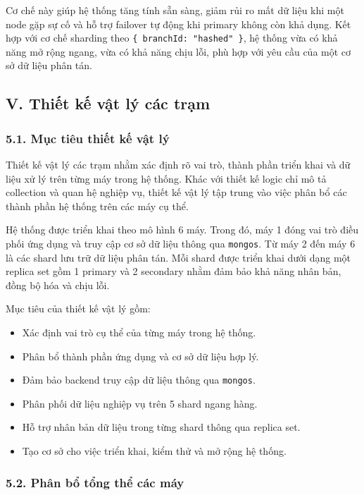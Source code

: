 \documentclass[12pt,a4paper]{article}
\begin{document}
Cơ chế này giúp hệ thống tăng tính sẵn sàng, giảm rủi ro mất dữ liệu khi một node gặp sự cố và hỗ trợ failover tự động khi primary không còn khả dụng. Kết hợp với cơ chế sharding theo \texttt{\{ branchId: "hashed" \}}, hệ thống vừa có khả năng mở rộng ngang, vừa có khả năng chịu lỗi, phù hợp với yêu cầu của một cơ sở dữ liệu phân tán.



\subsection*{V. Thiết kế vật lý các trạm}

\subsubsection*{5.1. Mục tiêu thiết kế vật lý}

Thiết kế vật lý các trạm nhằm xác định rõ vai trò, thành phần triển khai và dữ liệu xử lý trên từng máy trong hệ thống. Khác với thiết kế logic chỉ mô tả collection và quan hệ nghiệp vụ, thiết kế vật lý tập trung vào việc phân bổ các thành phần hệ thống trên các máy cụ thể.

Hệ thống được triển khai theo mô hình 6 máy. Trong đó, máy 1 đóng vai trò điều phối ứng dụng và truy cập cơ sở dữ liệu thông qua \texttt{mongos}. Từ máy 2 đến máy 6 là các shard lưu trữ dữ liệu phân tán. Mỗi shard được triển khai dưới dạng một replica set gồm 1 primary và 2 secondary nhằm đảm bảo khả năng nhân bản, đồng bộ hóa và chịu lỗi.

Mục tiêu của thiết kế vật lý gồm:

\begin{itemize}
    \item Xác định vai trò cụ thể của từng máy trong hệ thống.
    \item Phân bổ thành phần ứng dụng và cơ sở dữ liệu hợp lý.
    \item Đảm bảo backend truy cập dữ liệu thông qua \texttt{mongos}.
    \item Phân phối dữ liệu nghiệp vụ trên 5 shard ngang hàng.
    \item Hỗ trợ nhân bản dữ liệu trong từng shard thông qua replica set.
    \item Tạo cơ sở cho việc triển khai, kiểm thử và mở rộng hệ thống.
\end{itemize}

\subsubsection*{5.2. Phân bổ tổng thể các máy}
\end{document}
